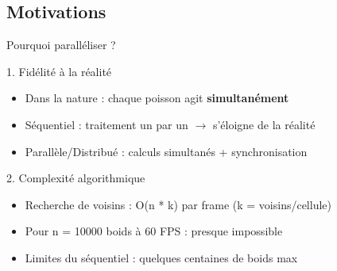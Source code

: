 \documentclass[aspectratio=169]{beamer}
\begin{document}
\subsection{Motivations}
\begin{frame}{Pourquoi paralléliser ?}
\begin{block}{1. Fidélité à la réalité}
    \begin{itemize}
        \item Dans la nature : chaque poisson agit \textbf{simultanément}
        \item Séquentiel : traitement un par un $\rightarrow$ s'éloigne de la réalité
        \item Parallèle/Distribué : calculs simultanés + synchronisation
    \end{itemize}
\end{block}

\begin{block}{2. Complexité algorithmique}
    \begin{itemize}
        \item Recherche de voisins : O(n * k) par frame (k = voisins/cellule)
        \item Pour n = 10000 boids à 60 FPS : presque impossible
        \item Limites du séquentiel : quelques centaines de boids max
    \end{itemize}
\end{block}
\end{frame}
\end{document}
